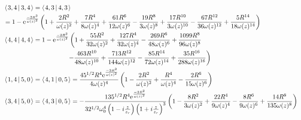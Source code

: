 \documentclass[11pt]{amsart}
\makeatletter
\newcommand{\e}{{\rm e}}				%
\newcommand{\msp}[1]{\mspace{#1mu}}		%
\newcommand{\0}{\varnothing}		%
\newcommand{\brac}[2]{\left\langle\msp{2} #1\left\lvert \msp{3.5} #2 \right.\right\rangle}	%
\newcommand{\1}{!}
\newcommand{\2}{@}
\newcommand{\3}{\#}
\newcommand{\4}{\$}
\newcommand{\5}{\%}
\newcommand{\6}{$^\wedge$}
\newcommand{\7}{\&}
\newcommand{\8}{*}
\newcommand{\9}{(}
\makeatother
\begin{document}
\begin{align*}
 \\
 &
 \brac{3,4}{3,4} = \brac{4,3}{4,3} 
 \\
 &
 =1-\e^{\frac{-2R^2}{\omega(z)^2}}\left(1+\frac{2R^2}{\omega(z)^2}+\frac{7R^4}{8\omega(z)^4}+\frac{61R^6}{12\omega(z)^6}-\frac{19R^8}{3\omega(z)^8}+\frac{17R^{10}}{3\omega(z)^{10}}-\frac{67R^{12}}{36\omega(z)^{12}}+\frac{5R^{14}}{18\omega(z)^{14}}\right)
 \\
 &
 \brac{4,4}{4,4}  = 1-\e^{\frac{-2R^2}{\omega(z)^2}}\left(1+\frac{55R^2}{32\omega(z)^2}+\frac{127R^4}{32\omega(z)^4}-\frac{269R^6}{48\omega(z)^6}+\frac{1099R^8}{96\omega(z)^8}\right.
 \\
 &\left.\msp{180}-\frac{463R^{10}}{48\omega(z)^{10}}+\frac{713R^{12}}{144\omega(z)^{12}}-\frac{85R^{14}}{72\omega(z)^{14}}+\frac{35R^{16}}{288\omega(z)^{16}}\right)
 \\
 &
 \brac{1,4}{5,0} = \brac{4,1}{0,5} = \frac{45^{1/2}R^4\e^{\frac{-2R^2}{\omega(z)^2}}}{4\omega(z)^4}\left(1-\frac{2R^2}{\omega(z)^2}+\frac{R^4}{\omega(z)^4}-\frac{2R^6}{15\omega(z)^6}\right)
 \\
 &
 \brac{3,4}{5,0}=\brac{4,3}{0,5}  = -\frac{135^{1/2}R^4\e^{\frac{-2R^2}{\omega(z)^2}}}{32^{1/2}\omega_0^4\left(1-i\frac{z}{z_r}\right)\left(1+i\frac{z}{z_r}\right)^3}\left(1-\frac{8R^2}{3\omega(z)^2}+\frac{22R^4}{9\omega(z)^4}-\frac{8R^6}{9\omega(z)^6}+\frac{14R^8}{135\omega(z)^8}\right)
 \end{align*}
\end{document}
